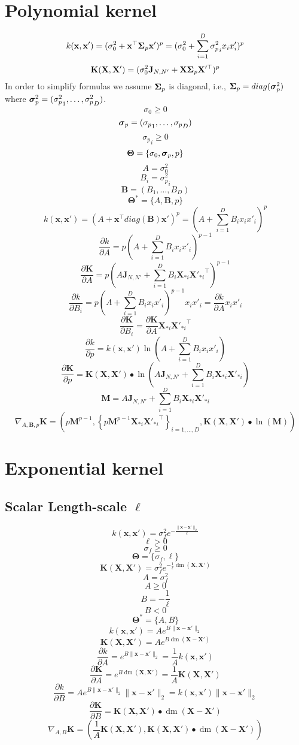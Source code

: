 \documentclass[a4paper,11pt]{article}
\newcommand\x{{\mathbf x}}
\newcommand\X{{\mathbf X}}
\newcommand\K{{\mathbf K}}
\DeclareMathOperator*{\dm}{dm}
\newcommand{\Ivec}[1]{\mbox{\boldmath $#1$}}
\begin{document}
\section{Polynomial kernel}
$$k(\x,\x') = (\sigma_0^2 + \x^{\top} \Ivec{\Sigma}_p \x')^p =
(\sigma_0^2 + \sum_{i=1}^D {\sigma^2_p}_i x_i x'_i)^p$$
$$\K(\X,\X') = (\sigma_0^2 \mathbf{J}_{N,N'} + \X \Ivec{\Sigma}_p
\X'^{\top})^p$$
In order to simplify formulas we assume $\Ivec{\Sigma}_p$ is diagonal, i.e.,
$\Ivec{\Sigma}_p = diag(\Ivec{\sigma}^2_p)$ where $\Ivec{\sigma}^2_p =
({\sigma^2_p}_1,\ldots,{\sigma^2_p}_D)$.
$$\sigma_0 \ge 0$$
$$\Ivec{\sigma}_p = ({\sigma_p}_1,\ldots,{\sigma_p}_D)$$
$${\sigma_p}_i \ge 0$$
$$\mathbf{\Theta} = \{\sigma_0,\Ivec{\sigma}_p, p\}$$
$$A = \sigma_0^2$$
$$B_i = {\sigma^2_p}_i$$
$$\mathbf{B} = (B_1,\ldots,B_D)$$
$$\mathbf{\Theta}^* = \{A,\mathbf{B}, p\}$$
$$k(\x,\x') = (A + \x^{\top} diag(\mathbf{B}) \x')^p = (A +
\sum_{i=1}^D B_i x_i x'_i)^p$$
$$\frac{\partial k}{\partial A} = p(A + \sum_{i=1}^D B_i x_i
x'_i)^{p-1}$$
$$\frac{\partial \K}{\partial A} = p(A\mathbf{J}_{N,N'} + \sum_{i=1}^D
B_i \X_{*i} {\X'_{*i}}^{\top})^{p-1}$$
$$\frac{\partial k}{\partial B_i} = p(A + \sum_{i=1}^D B_i x_i
x'_i)^{p-1} x_i x'_i = \frac{\partial k}{\partial A} x_i x'_i$$
$$\frac{\partial \K}{\partial B_i} = \frac{\partial \K}{\partial A} \X_{*i} {\X'_{*i}}^{\top}$$
$$\frac{\partial k}{\partial p} = k(\x,\x') \ln(A + \sum_{i=1}^D B_i x_i
x'_i)$$
$$\frac{\partial \K}{\partial p} = \K(\X,\X') \bullet \ln(A \mathbf{J}_{N,N'}+ \sum_{i=1}^D B_i \X_{*i} \X'_{*i})$$
$$\mathbf{M} = A \mathbf{J}_{N,N'}+ \sum_{i=1}^D B_i \X_{*i} \X'_{*i}$$
$$\nabla_{A,\mathbf{B},p} \K = \left(p\mathbf{M}^{p-1},\left\{p\mathbf{M}^{p-1} \X_{*i} {\X'_{*i}}^{\top} \right\}_{i=1,\ldots,D}, \K(\X,\X') \bullet \ln(\mathbf{M}) \right)$$

\section{Exponential kernel}
\subsection{Scalar Length-scale $\ell$}
$$k(\x,\x') = \sigma_f^2 e^{-\frac{\|\x-\x'\|_2}{\ell}}$$
$$\ell > 0$$
$$\sigma_f \ge 0$$
$$\mathbf{\Theta} = \{ \sigma_f, \ell \}$$
$$\K(\X,\X') = \sigma_f^2 e^{-\frac{1}{\ell}\dm(\X,\X')}$$
$$A = \sigma_f^2$$
$$A \ge 0$$
$$B = -\frac{1}{\ell}$$
$$B < 0$$
$$\mathbf{\Theta}^* = \{ A, B \}$$
$$k(\x,\x') = A e^{B\|\x-\x'\|_2}$$
$$\K(\X,\X') = A e^{B \dm(\X-\X')}$$
$$\frac{\partial k}{\partial A} = e^{B\|\x-\x'\|_2} = \frac{1}{A}k(\x,\x')$$
$$\frac{\partial \K}{\partial A} = e^{B \dm(\X,\X')} = \frac{1}{A} \K(\X,\X')$$
$$\frac{\partial k}{\partial B} = A e^{B\|\x-\x'\|_2} \|\x-\x'\|_2 =
k(\x,\x') \|\x-\x'\|_2$$
$$\frac{\partial \K}{\partial B} = \K(\X,\X') \bullet \dm(\X-\X')$$
$$\nabla_{A,B} \K = (\frac{1}{A} \K(\X,\X'), \K(\X,\X') \bullet \dm(\X-\X'))$$
\end{document}
